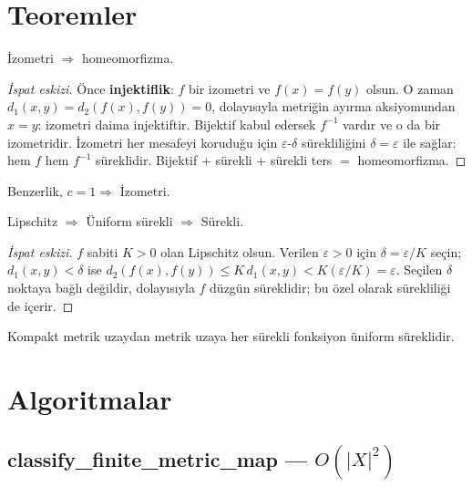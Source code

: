 \section{Teoremler}

\begin{theorem}
İzometri $\Rightarrow$ homeomorfizma.
\begin{proof}[İspat eskizi]
Önce \textbf{injektiflik}: $f$ bir izometri ve $f(x)=f(y)$ olsun. O zaman
$d_1(x,y) = d_2(f(x),f(y)) = 0$, dolayısıyla metriğin ayırma aksiyomundan $x=y$:
izometri daima injektiftir. Bijektif kabul edersek $f^{-1}$ vardır ve o da bir
izometridir. İzometri her mesafeyi koruduğu için $\varepsilon$-$\delta$
sürekliliğini $\delta=\varepsilon$ ile sağlar: hem $f$ hem $f^{-1}$ süreklidir.
Bijektif + sürekli + sürekli ters $=$ homeomorfizma.
\end{proof}
\end{theorem}

\begin{theorem}
Benzerlik, $c=1 \Rightarrow$ İzometri.
\end{theorem}

\begin{theorem}
Lipschitz $\Rightarrow$ Üniform sürekli $\Rightarrow$ Sürekli.
\begin{proof}[İspat eskizi]
$f$ sabiti $K>0$ olan Lipschitz olsun. Verilen $\varepsilon>0$ için
$\delta = \varepsilon/K$ seçin; $d_1(x,y)<\delta$ ise
$d_2(f(x),f(y)) \le K\,d_1(x,y) < K(\varepsilon/K) = \varepsilon$. Seçilen
$\delta$ noktaya bağlı değildir, dolayısıyla $f$ düzgün süreklidir; bu özel
olarak sürekliliği de içerir.
\end{proof}
\end{theorem}

\begin{theorem}
Kompakt metrik uzaydan metrik uzaya her sürekli fonksiyon üniform süreklidir.
\end{theorem}

\section{Algoritmalar}

\subsection{classify\_finite\_metric\_map — $O(|X|^2)$}

